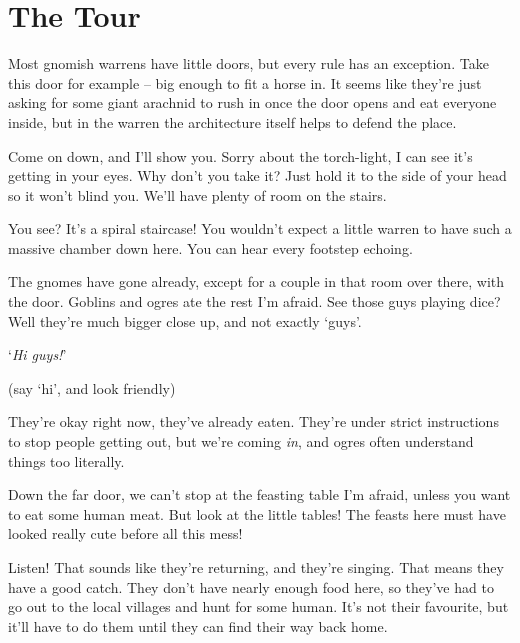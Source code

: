\chapter{The Tour}

\begin{multicols}{2}
\setcounter{list}{0}

\begin{exampletext}
\noindent
Most gnomish warrens have little doors, but every rule has an exception.
Take this door for example -- big enough to fit a horse in.
It seems like they're just asking for some giant arachnid to rush in once the door opens and eat everyone inside, but in the \gls{warren} the architecture itself helps to defend the place.

Come on down, and I'll show you.
Sorry about the torch-light, I can see it's getting in your eyes.
Why don't you take it?
Just hold it to the side of your head so it won't blind you.
We'll have plenty of room on the stairs.

You see?
It's a spiral staircase!
You wouldn't expect a little warren to have such a massive chamber down here.
You can hear every footstep echoing.


The gnomes have gone already, except for a couple in that room over there, with the door.
Goblins and ogres ate the rest I'm afraid.
See those guys playing dice?
Well they're much bigger close up, and not exactly `guys'.

`\textit{Hi guys!}'

(say `hi', and look friendly)

They're okay right now, they've already eaten.
They're under strict instructions to stop people getting out, but we're coming \textit{in}, and ogres often understand things too literally.

Down the far door, we can't stop at the feasting table I'm afraid, unless you want to eat some human meat.
But look at the little tables!
The feasts here must have looked really cute before all this mess!

Listen!
That sounds like they're returning, and they're singing.
That means they have a good catch.
They don't have nearly enough food here, so they've had to go out to the local \glspl{village} and hunt for some human.
It's not their favourite, but it'll have to do them until they can find their way back home.


\end{exampletext}
\end{multicols}
